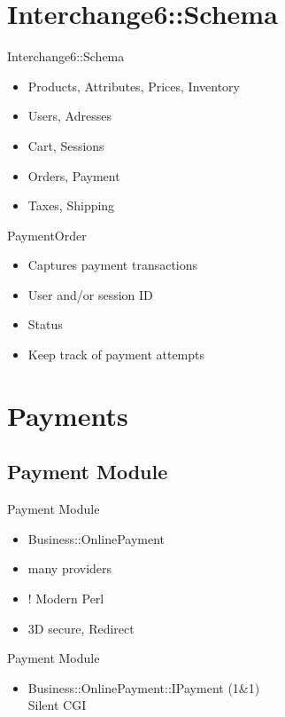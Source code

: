 \section{Interchange6::Schema}
\begin{frame}{Interchange6::Schema}
\begin{itemize}
 \item Products, Attributes, Prices, Inventory 
 \item Users, Adresses
 \item Cart, Sessions
 \item Orders, Payment
 \item Taxes, Shipping
\end{itemize}
\end{frame}

\begin{frame}{PaymentOrder}
\begin{itemize}
 \item Captures payment transactions
 \item User and/or session ID
 \item Status
 \item Keep track of payment attempts
\end{itemize}
\end{frame}

\section{Payments}
\subsection{Payment Module}
\begin{frame}{Payment Module}
\begin{itemize}
\item Business::OnlinePayment
\item many providers
\item ! Modern Perl
\item 3D secure, Redirect
\end{itemize}
\end{frame}

\begin{frame}{Payment Module}
\begin{itemize}
\item Business::OnlinePayment::IPayment (1\&1) \\
Silent CGI
\end{itemize}
\end{frame}

